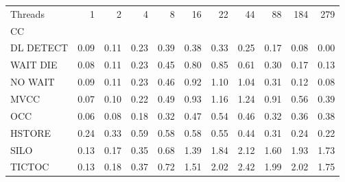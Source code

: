 \begin{tabular}{lrrrrrrrrrr}
\toprule
Threads &  1   &  2   &  4   &  8   &  16  &  22  &  44  &  88  &  184 &  279 \\
CC        &      &      &      &      &      &      &      &      &      &      \\
\midrule
DL DETECT & 0.09 & 0.11 & 0.23 & 0.39 & 0.38 & 0.33 & 0.25 & 0.17 & 0.08 & 0.00 \\
WAIT DIE  & 0.08 & 0.11 & 0.23 & 0.45 & 0.80 & 0.85 & 0.61 & 0.30 & 0.17 & 0.13 \\
NO WAIT   & 0.09 & 0.11 & 0.23 & 0.46 & 0.92 & 1.10 & 1.04 & 0.31 & 0.12 & 0.08 \\
MVCC      & 0.07 & 0.10 & 0.22 & 0.49 & 0.93 & 1.16 & 1.24 & 0.91 & 0.56 & 0.39 \\
OCC       & 0.06 & 0.08 & 0.18 & 0.32 & 0.47 & 0.54 & 0.46 & 0.32 & 0.36 & 0.38 \\
HSTORE    & 0.24 & 0.33 & 0.59 & 0.58 & 0.58 & 0.55 & 0.44 & 0.31 & 0.24 & 0.22 \\
SILO      & 0.13 & 0.17 & 0.35 & 0.68 & 1.39 & 1.84 & 2.12 & 1.60 & 1.93 & 1.73 \\
TICTOC    & 0.13 & 0.18 & 0.37 & 0.72 & 1.51 & 2.02 & 2.42 & 1.99 & 2.02 & 1.75 \\
\bottomrule
\end{tabular}
